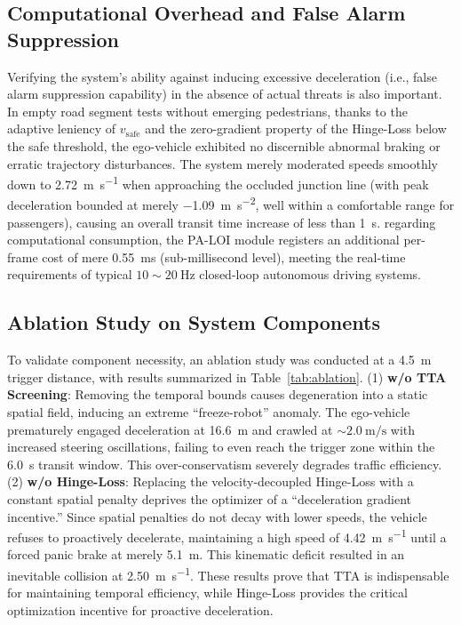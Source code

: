 \documentclass[letterpaper, 10 pt, conference]{ieeeconf}  %
\begin{document}
\subsection{Computational Overhead and False Alarm Suppression}
Verifying the system's ability against inducing excessive deceleration (i.e., false alarm suppression capability) in the absence of actual threats is also important. In empty road segment tests without emerging pedestrians, thanks to the adaptive leniency of $v_{\text{safe}}$ and the zero-gradient property of the Hinge-Loss below the safe threshold, the ego-vehicle exhibited no discernible abnormal braking or erratic trajectory disturbances. The system merely moderated speeds smoothly down to \SI{2.72}{\meter\per\second} when approaching the occluded junction line (with peak deceleration bounded at merely \SI{-1.09}{\meter\per\second\squared}, well within a comfortable range for passengers), causing an overall transit time increase of less than \SI{1}{\second}.
regarding computational consumption, the PA-LOI module registers an additional per-frame cost of mere \SI{0.55}{\milli\second} (sub-millisecond level), meeting the real-time requirements of typical $10\sim\SI{20}{\hertz}$ closed-loop autonomous driving systems.

\subsection{Ablation Study on System Components}
To validate component necessity, an ablation study was conducted at a \SI{4.5}{\meter} trigger distance, with results summarized in Table~\ref{tab:ablation}. 
(1) \textbf{w/o TTA Screening}: Removing the temporal bounds causes degeneration into a static spatial field, inducing an extreme ``freeze-robot'' anomaly. The ego-vehicle prematurely engaged deceleration at \SI{16.6}{\meter} and crawled at $\sim\SI{2.0}{\meter\per\second}$ with increased steering oscillations, failing to even reach the trigger zone within the \SI{6.0}{\second} transit window. This over-conservatism severely degrades traffic efficiency. 
(2) \textbf{w/o Hinge-Loss}: Replacing the velocity-decoupled Hinge-Loss with a constant spatial penalty deprives the optimizer of a ``deceleration gradient incentive.'' Since spatial penalties do not decay with lower speeds, the vehicle refuses to proactively decelerate, maintaining a high speed of \SI{4.42}{\meter\per\second} until a forced panic brake at merely \SI{5.1}{\meter}. This kinematic deficit resulted in an inevitable collision at \SI{2.50}{\meter\per\second}. 
These results prove that TTA is indispensable for maintaining temporal efficiency, while Hinge-Loss provides the critical optimization incentive for proactive deceleration.
\end{document}
